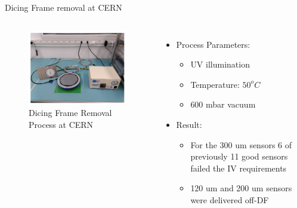 \documentclass{beamer}
\begin{document}
\begin{frame}{Dicing Frame removal at CERN}
  \begin{columns}
    \begin{figure}
      \includegraphics[width=1.0\textwidth]{plots/DF_removal_Picture.png}
      \caption{Dicing Frame Removal Process at CERN}
    \end{figure}

    \begin{itemize}
      \item Process Parameters:
      \begin{itemize}
        \item UV illumination
        \item Temperature: $50  ^oC$
        \item 600 mbar vacuum
      \end{itemize}
      \item Result:
      \begin{itemize}
        \item For the 300 um sensors 6 of previously 11 good sensors failed the IV requirements
        \item 120 um and 200 um sensors were delivered off-DF
      \end{itemize}
    \end{itemize}

\end{columns}

\begin{figure}
\end{figure} 
  \href{https://indico.cern.ch/event/1085830/contributions/4565314/attachments/2344490/3998306/IVCV_recent_HGCal_prototype_sensors_Readiness_Review.pdf}{}
\end{frame}
\end{document}
